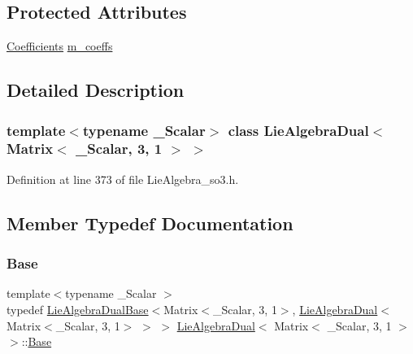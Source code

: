 \subsection*{Protected Attributes}
\begin{DoxyCompactItemize}
\item 
\hyperlink{class_lie_algebra_dual_3_01_matrix_3_01___scalar_00_013_00_011_01_4_01_4_ae90a3999d66fafefffe5538cd72985ee}{Coefficients} \hyperlink{class_lie_algebra_dual_3_01_matrix_3_01___scalar_00_013_00_011_01_4_01_4_a85d9fafc5af8ef5b52eb738f5ff191b3}{m\+\_\+coeffs}
\end{DoxyCompactItemize}


\subsection{Detailed Description}
\subsubsection*{template$<$typename \+\_\+\+Scalar$>$\newline
class Lie\+Algebra\+Dual$<$ Matrix$<$ \+\_\+\+Scalar, 3, 1 $>$ $>$}



Definition at line 373 of file Lie\+Algebra\+\_\+so3.\+h.



\subsection{Member Typedef Documentation}
\hypertarget{class_lie_algebra_dual_3_01_matrix_3_01___scalar_00_013_00_011_01_4_01_4_a32622861071e6634cc868d5e6ec115c7}{}\label{class_lie_algebra_dual_3_01_matrix_3_01___scalar_00_013_00_011_01_4_01_4_a32622861071e6634cc868d5e6ec115c7} 
\subsubsection{\texorpdfstring{Base}{Base}}
{\footnotesize\ttfamily template$<$typename \+\_\+\+Scalar $>$ \\
typedef \hyperlink{class_lie_algebra_dual_base}{Lie\+Algebra\+Dual\+Base}$<$Matrix$<$\+\_\+\+Scalar, 3, 1$>$, \hyperlink{class_lie_algebra_dual}{Lie\+Algebra\+Dual}$<$Matrix$<$\+\_\+\+Scalar, 3, 1$>$ $>$ $>$ \hyperlink{class_lie_algebra_dual}{Lie\+Algebra\+Dual}$<$ Matrix$<$ \+\_\+\+Scalar, 3, 1 $>$ $>$\+::\hyperlink{class_lie_algebra_dual_3_01_matrix_3_01___scalar_00_013_00_011_01_4_01_4_a32622861071e6634cc868d5e6ec115c7}{Base}\hspace{0.3cm}{\ttfamily [protected]}}

